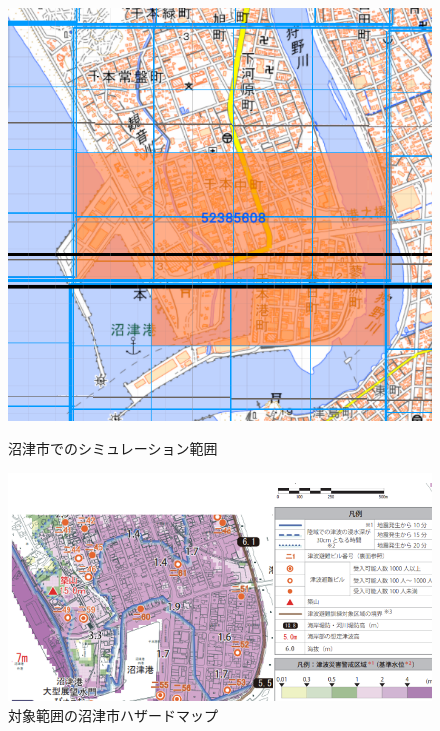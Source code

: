 \begin{figure}[H]
  \centering
  \begin{minipage}{0.45\textwidth}
      \centering
      \includegraphics[width=\textwidth]{Figures/NumazuRange.png} 
      \caption{沼津市でのシミュレーション範囲}
      \label{fig:YokosukaMapRange}
  \end{minipage}
  \hfill %
  \begin{minipage}{0.45\textwidth}
      \centering
      \includegraphics[width=\textwidth]{Figures/NumazuHazerd.png} 
      \caption{対象範囲の沼津市ハザードマップ}
      \label{fig:right_image}
  \end{minipage}
\end{figure}

